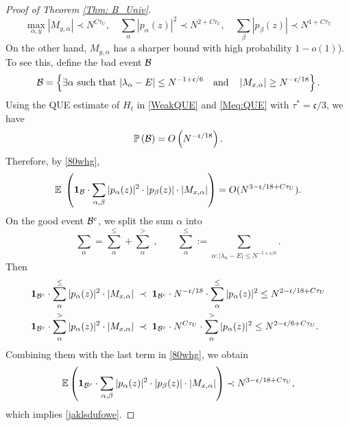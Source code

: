 \documentclass[10pt,reqno]{article}
\theoremstyle{plain} %
\theoremstyle{remark}
\numberwithin{equation}{section}
\begin{document}
\begin{proof}[Proof of Theorem \ref{Thm: B_Univ}]
\begin{equation}
       \max_{\alpha,y} |M_{y,\alpha}|\prec  N^{C\tau_U},\quad  \sum_{\alpha } |p_\alpha(z)|^2 \prec N^{2+C\tau_U},\quad  \sum_{ \beta}    |p_\beta(z)|\prec N^{1+C\tau_U}
\end{equation} 
On the other hand,  $M_{y,\alpha}$ has a sharper bound  with  high probability  $1-o(1)$). 
To see this, define  the bad event $\cal B$ %
$$
{\cal B} = \left\{\exists \alpha \mbox { such that } |\lambda_\alpha-E|\le N^{-1+\mathfrak c/6} \quad \mbox{and} \quad \left| M_{x,\alpha}\right|\ge N^{-\mathfrak c/18}\right\}.
$$
Using the QUE estimate of $H_t$ in \eqref{WeakQUE} and \eqref{Meq:QUE} with $\tau^*=\mathfrak c/3$, we have 
$$
\mathbb P\left({\cal B} \right)=O\left(N^{-\mathfrak c/18}\right). 
$$
Therefore, by  \eqref{80whg}, 
$$
\mathbb E\; \left( {\bf 1}_{{\cal B} }\cdot \sum_{\alpha,\beta} |p_\alpha(z)|^2 \cdot |p_\beta(z)|\cdot \left| M_{x,\alpha} \right| \right)
=O( N^{3-\mathfrak c/18+C\tau_U} ).
$$
On the good  event ${\cal B}^c $, we split the sum $\alpha$ into 
$$
\sum_{\alpha }= \sum^{\le} _{\alpha }+\sum^{>} _{\alpha }\;,\quad \quad \sum^{\le} _{\alpha }:=\sum_{\alpha: |\lambda_\alpha-E|\le N^{-1+\mathfrak c/6}} .
$$
Then
\begin{align}
{\bf 1}_{{\cal B}^c }\cdot \sum_{\alpha } ^{\le}|p_\alpha(z)|^2  \cdot \left| M_{x,\alpha} \right|& \; \prec \;
{\bf 1}_{{\cal B}^c }\cdot N^{-\mathfrak c/18}\cdot  \sum_{\alpha } ^{\le} |p_\alpha(z)|^2  \le N^{2-\mathfrak c/18+C\tau_U} 
\\\nonumber
{\bf 1}_{{\cal B}^c }\cdot \sum_{\alpha } ^{>}|p_\alpha(z)|^2  \cdot \left| M_{x,\alpha} \right|  &\; \prec \;
{\bf 1}_{{\cal B}^c }\cdot N^{C\tau_U}\cdot  \sum_{\alpha } ^{>} |p_\alpha(z)|^2  \le N^{2-\mathfrak c/6+C\tau_U} .
 \end{align}
 Combining  them with the last term in \eqref{80whg},  we obtain 
$$
\mathbb E \left({\bf 1}_{{\cal B}^c }\cdot \sum_{\alpha,\beta} |p_\alpha(z)|^2 \cdot |p_\beta(z)|\cdot \left| M_{x,\alpha} \right|\right) 
\prec  N^{3-\mathfrak c/18+C\tau_U} , 
$$
which implies  \eqref{jaklsdufowe}. 

 


\end{proof}
\end{document}
